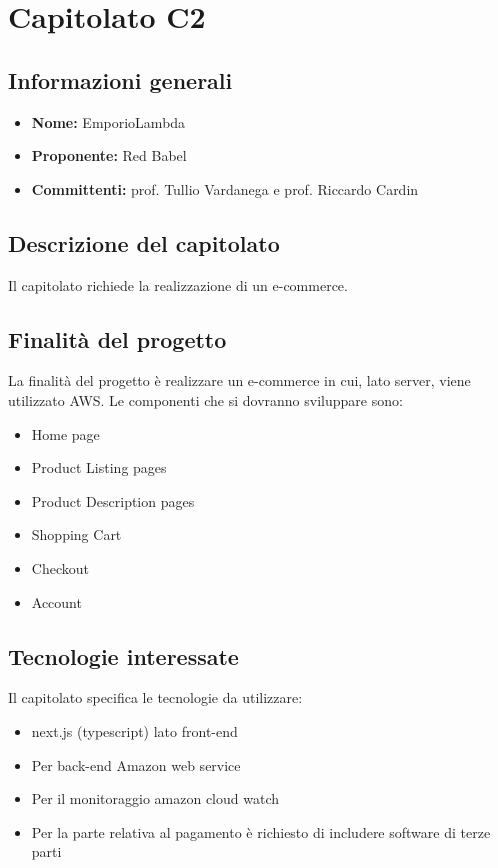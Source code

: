 \section{Capitolato C2}

\subsection{Informazioni generali}
\begin{itemize}
\item \textbf{Nome:} EmporioLambda
\item \textbf{Proponente:} Red Babel
\item \textbf{Committenti:} prof. Tullio Vardanega e prof. Riccardo Cardin
\end{itemize}

\subsection{Descrizione del capitolato}
Il capitolato richiede la realizzazione di un e-commerce.

\subsection{Finalità del progetto}
La finalità del progetto è realizzare un e-commerce in cui, lato server, viene utilizzato AWS. Le componenti che si dovranno sviluppare sono:
\begin{itemize}
\item Home page
\item Product Listing pages
\item Product Description pages
\item Shopping Cart
\item Checkout
\item Account
\end{itemize}

\subsection{Tecnologie interessate}
Il capitolato specifica le tecnologie da utilizzare:
\begin{itemize}
\item next.js (typescript) lato front-end
\item Per back-end Amazon web service
\item Per il monitoraggio amazon cloud watch
\item Per la parte relativa al pagamento è richiesto di includere software di terze parti
\end{itemize}

